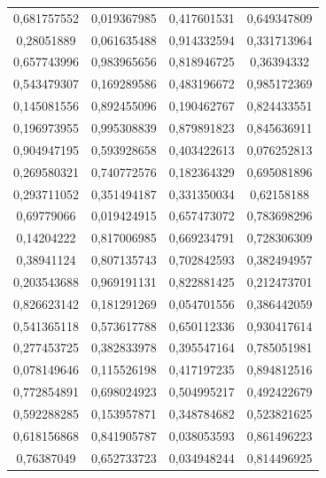 \documentclass[a4paper,12pt]{article}
\begin{document}
\begin{longtable}{|c|c|c|c|}
0,681757552 & 0,019367985 & 0,417601531 & 0,649347809 \\
0,28051889 & 0,061635488 & 0,914332594 & 0,331713964 \\
0,657743996 & 0,983965656 & 0,818946725 & 0,36394332 \\
0,543479307 & 0,169289586 & 0,483196672 & 0,985172369 \\
0,145081556 & 0,892455096 & 0,190462767 & 0,824433551 \\
0,196973955 & 0,995308839 & 0,879891823 & 0,845636911 \\
0,904947195 & 0,593928658 & 0,403422613 & 0,076252813 \\
0,269580321 & 0,740772576 & 0,182364329 & 0,695081896 \\
0,293711052 & 0,351494187 & 0,331350034 & 0,62158188 \\
0,69779066 & 0,019424915 & 0,657473072 & 0,783698296 \\
0,14204222 & 0,817006985 & 0,669234791 & 0,728306309 \\
0,38941124 & 0,807135743 & 0,702842593 & 0,382494957 \\
0,203543688 & 0,969191131 & 0,822881425 & 0,212473701 \\
0,826623142 & 0,181291269 & 0,054701556 & 0,386442059 \\
0,541365118 & 0,573617788 & 0,650112336 & 0,930417614 \\
0,277453725 & 0,382833978 & 0,395547164 & 0,785051981 \\
0,078149646 & 0,115526198 & 0,417197235 & 0,894812516 \\
0,772854891 & 0,698024923 & 0,504995217 & 0,492422679 \\
0,592288285 & 0,153957871 & 0,348784682 & 0,523821625 \\
0,618156868 & 0,841905787 & 0,038053593 & 0,861496223 \\
0,76387049 & 0,652733723 & 0,034948244 & 0,814496925 \\
\end{longtable}
\end{document}
